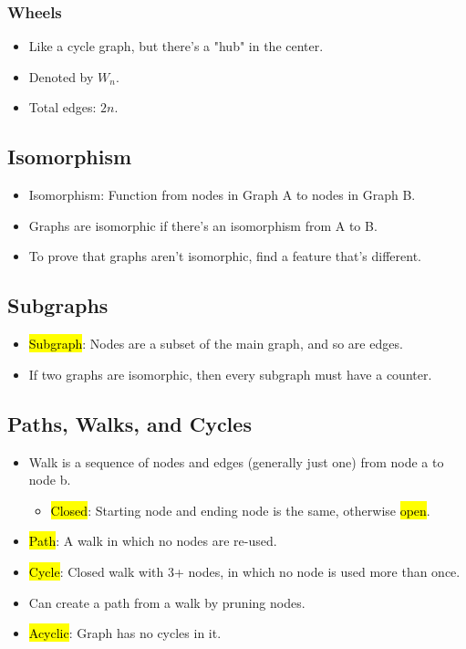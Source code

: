\subsubsection{Wheels}
\begin{itemize}
    \item Like a cycle graph, but there's a "hub" in the center.
    \item Denoted by $W_n$.
    \item Total edges: $2n$.
\end{itemize}

\subsection{Isomorphism}
\begin{itemize}
    \item Isomorphism: Function from nodes in Graph A to nodes in Graph B.
    \item Graphs are isomorphic if there's an isomorphism from A to B.
    \item To prove that graphs aren't isomorphic, find a feature that's different.
\end{itemize}

\subsection{Subgraphs}
\begin{itemize}
    \item \hl{Subgraph}: Nodes are a subset of the main graph, and so are edges.
    \item If two graphs are isomorphic, then every subgraph must have a counter.
\end{itemize}

\subsection{Paths, Walks, and Cycles}
\begin{itemize}
    \item Walk is a sequence of nodes and edges (generally just one) from node a to node b. 
    \begin{itemize}
        \item \hl{Closed}: Starting node and ending node is the same, otherwise \hl{open}.
    \end{itemize}
    \item \hl{Path}: A walk in which no nodes are re-used.
    \item \hl{Cycle}: Closed walk with 3+ nodes, in which no node is used more than once.
    \item Can create a path from a walk by pruning nodes.
    \item \hl{Acyclic}: Graph has no cycles in it.
\end{itemize}

